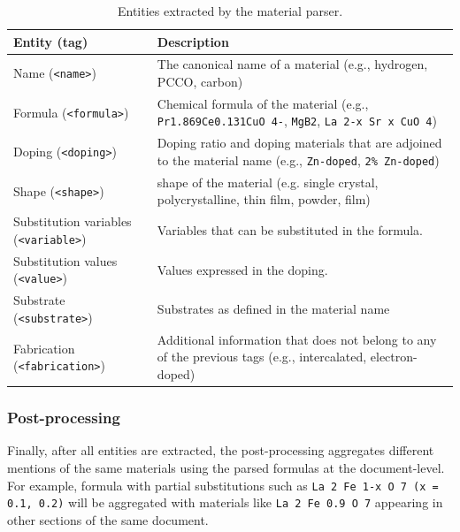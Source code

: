 \begin{table}[ht]
    \centering\small
    \caption{Entities extracted by the material parser. }

    \begin{tabular}{m{10em} m{20em}}
        \toprule
        \textbf{Entity} (\textbf{tag})               & \textbf{Description}                                                                                                              \\
        \midrule
        Name (\texttt{<name>})                       & The canonical name of a material (e.g., hydrogen, PCCO, carbon)                                                                    \\
        Formula (\texttt{<formula>})                 & Chemical formula of the material (e.g., \texttt{Pr1.869Ce0.131CuO 4-}, \texttt{MgB2}, \texttt{La 2-x Sr x CuO 4})                  \\
        Doping (\texttt{<doping>})                   & Doping ratio and doping materials that are adjoined to the material name (e.g., \texttt{Zn-doped}, \texttt{2\% Zn-doped})          \\
        Shape (\texttt{<shape>})                     & shape of the material (e.g. single crystal, polycrystalline, thin film, powder, film)                                             \\
        Substitution variables (\texttt{<variable>}) & Variables that can be substituted in the formula.                                                                                 \\
        Substitution values (\texttt{<value>})       & Values expressed in the doping.                                                                                                   \\
        Substrate (\texttt{<substrate>})             & Substrates as defined in the material name                                                                                        \\
        Fabrication (\texttt{<fabrication>})         & Additional information that does not belong to any of the previous tags  (e.g., intercalated, electron-doped) \\
        \bottomrule
    \end{tabular}
    
    \label{tab:material-parser-entities}
\end{table}


\subsubsection{Post-processing}
Finally, after all entities are extracted, the post-processing aggregates different mentions of the same materials using the parsed formulas at the document-level.
For example, formula with partial substitutions such as \texttt{La 2 Fe 1-x O 7 (x = 0.1, 0.2)} will be aggregated with materials like \texttt{La 2 Fe 0.9 O 7} appearing in other sections of the same document.


